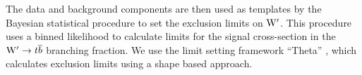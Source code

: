 
The data and background components are then used as
templates by the Bayesian statistical procedure 
to set the exclusion limits on $\mathrm{W}^\prime$.  This procedure uses a binned likelihood to calculate limits for the signal cross-section 
in the $\mathrm{W}^\prime \to {t\overline{b}}$ branching fraction.  
We use the limit setting framework ``Theta'' \cite{theta}, which calculates exclusion limits using a shape based approach.
